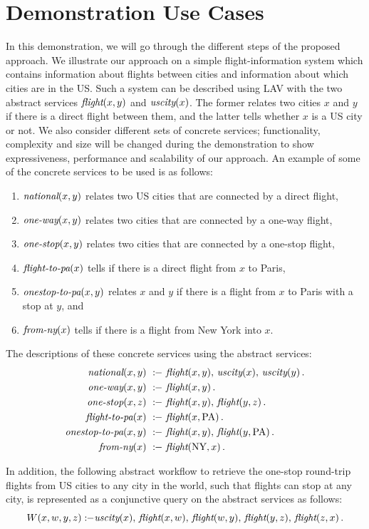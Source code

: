 \documentclass{llncs}
\newcommand{\qrule}{:\!\!-}
\newcommand{\flight}{\text{\it flight}}
\newcommand{\UScity}{\text{\it uscity}}
\newcommand{\national}{\text{\it national}}
\newcommand{\oneway}{\text{\it one-way}}
\newcommand{\onestop}{\text{\it one-stop}}
\newcommand{\flightPA}{\text{\it flight-to-pa}}
\newcommand{\onestopPA}{\text{\it onestop-to-pa}}
\newcommand{\fromNY}{\text{\it from-ny}}
\newcommand{\PA}{\text{PA}}
\newcommand{\NY}{\text{NY}}
\begin{document}
\section{Demonstration Use Cases}
In this demonstration, we will go through the different steps of the proposed approach. We illustrate our approach on  a simple flight-information system which contains information
about flights between cities and information about which cities are in
the US. Such a system can be described using LAV with the two abstract
services $\flight(x,y)$ and $\UScity(x)$. The former relates two cities
$x$ and $y$ if there is a direct flight between them, and the latter tells
whether $x$ is a US city or not. We also consider different sets of concrete services; functionality, complexity and size will be changed during the demonstration to show expressiveness, performance and scalability of our approach. An example of some of the concrete services to be used is as follows:
\begin{enumerate}[--]
\item $\national(x,y)$ relates two US cities that are connected by a direct flight,
\item $\oneway(x,y)$ relates two cities that are connected by a one-way flight,
\item $\onestop(x,y)$ relates two cities that are connected by a one-stop flight,
\item $\flightPA(x)$ tells if there is a direct flight from $x$ to Paris,
\item $\onestopPA(x,y)$ relates $x$ and $y$ if there is a flight from $x$ to Paris
      with a stop at $y$, and
\item $\fromNY(x)$ tells if there is a flight from New York into $x$.
\end{enumerate}
The descriptions of these concrete services using the abstract services:
\begin{alignat*}{1}
\national(x,y)\   &\qrule\ \flight(x,y),\,\UScity(x),\,\UScity(y)\,. \\
\oneway(x,y)\     &\qrule\ \flight(x,y)\,. \\
\onestop(x,z)\    &\qrule\ \flight(x,y),\,\flight(y,z)\,. \\
\flightPA(x)\     &\qrule\ \flight(x,\PA)\,. \\
\onestopPA(x,y)\  &\qrule\ \flight(x,y),\,\flight(y,\PA)\,. \\
\fromNY(x)\       &\qrule\ \flight(\NY,x)\,.
\end{alignat*}

In addition, the following abstract workflow to retrieve
the one-stop round-trip flights from US cities to any city in the world, such that
flights can stop at any city, is represented as a conjunctive query on the abstract services as follows: 
\[ W(x,w,y,z) \qrule \UScity(x),\,\flight(x,w),\,\flight(w,y),\,\flight(y,z),\,\flight(z,x)\,. \]
\end{document}

